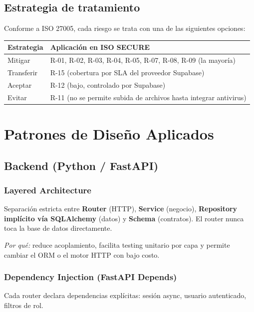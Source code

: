 \documentclass[12pt,a4paper,oneside]{article}
\begin{document}
\subsection{Estrategia de tratamiento}

Conforme a ISO 27005, cada riesgo se trata con una de las siguientes opciones:

\begin{table}[h]
\centering
\small
\begin{tabularx}{\textwidth}{lX}
\toprule
\textbf{Estrategia} & \textbf{Aplicación en ISO SECURE} \\
\midrule
Mitigar & R-01, R-02, R-03, R-04, R-05, R-07, R-08, R-09 (la mayoría) \\
Transferir & R-15 (cobertura por SLA del proveedor Supabase) \\
Aceptar & R-12 (bajo, controlado por Supabase) \\
Evitar & R-11 (no se permite subida de archivos hasta integrar antivirus) \\
\bottomrule
\end{tabularx}
\end{table}

\section{Patrones de Diseño Aplicados}

\subsection{Backend (Python / FastAPI)}

\subsubsection{Layered Architecture}
Separación estricta entre \textbf{Router} (HTTP), \textbf{Service} (negocio), \textbf{Repository implícito vía SQLAlchemy} (datos) y \textbf{Schema} (contratos). El router nunca toca la base de datos directamente.

\textit{Por qué:} reduce acoplamiento, facilita testing unitario por capa y permite cambiar el ORM o el motor HTTP con bajo costo.

\subsubsection{Dependency Injection (FastAPI Depends)}
Cada router declara dependencias explícitas: sesión async, usuario autenticado, filtros de rol.
\end{document}

